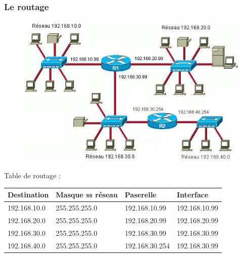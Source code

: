 \begin{frame}\frametitle{Le routage}

    \begin{figure}[H]
        \includegraphics[scale=0.35]{res/routageIP_2.png}
    \end{figure}
    Table de routage :
    \begin{table}[h]
        \begin{tabular}{l|l|l|l}
Destination   & Masque ss réseau  & Paserelle     & Interface   \\ \hline
192.168.10.0  & 255.255.255.0     & 192.168.10.99 & 192.168.10.99\\ \hline
192.168.20.0  & 255.255.255.0     & 192.168.20.99 & 192.168.20.99\\ \hline
192.168.30.0  & 255.255.255.0     & 192.168.30.99 & 192.168.30.99\\ \hline
\color{red}192.168.40.0&\color{red}255.255.255.0&\color{red}192.168.30.254&\color{red}192.168.30.99\\
        \end{tabular}
    \end{table}

\end{frame}



